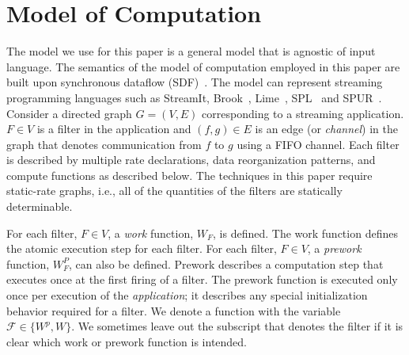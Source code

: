\section{Model of Computation}
\label{model}

The model we use for this paper is a general model that is agnostic of
input language.  The semantics of the model of computation employed in
this paper are built upon synchronous dataflow (SDF)~\cite{leeSDF}.
The model can represent streaming programming
languages such as StreamIt, Brook~\cite{brook04}, Lime~\cite{lime10},
SPL~\cite{spl09} and SPUR~\cite{spur05samos}.  Consider a directed
graph $G = (V, E)$ corresponding to a streaming application. $F \in V$
is a filter in the application and $(f, g) \in E$ is an edge (or {\it
  channel}) in the graph that denotes communication from $f$ to $g$
using a FIFO channel.  Each filter is described by multiple rate
declarations, data reorganization patterns, and compute functions as
described below. The techniques in this paper require static-rate
graphs, i.e., all of the quantities of the filters are statically
determinable.



For each filter, $F \in V$, a {\it work} function, $W_F$, is defined.
The work function defines the atomic execution step for each filter.
For each filter, $F \in V$, a {\it prework} function, $W_F^P$, can
also be defined.  Prework describes a computation step that executes
once at the first firing of a filter.  The prework function is
executed only once per execution of the {\it application}; it
describes any special initialization behavior required for a
filter. We denote a function with the variable $\mathcal{F} \in \{W^p,
W\}$.  We sometimes leave out the subscript that denotes the filter if
it is clear which work or prework function is intended.


